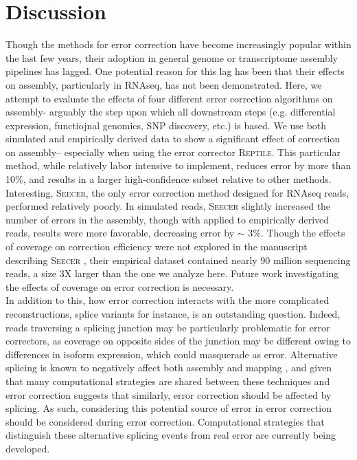 \documentclass[11pt]{article}
\begin{document}
\section*{Discussion}

Though the methods for error correction have become increasingly popular within the last few years, their adoption in general genome or transcriptome assembly pipelines has lagged. One potential reason for this lag has been that their effects on assembly, particularly in RNAseq, has not been demonstrated. Here, we attempt to evaluate the effects of four different error correction algorithms on assembly- arguably the step upon which all downstream steps (e.g. differential expression, functiojnal genomics, SNP discovery, etc.) is based. We use both simulated and empirically derived data to show a significant effect of correction on assembly-- especially when using the error corrector \textsc{Reptile}. This particular method, while relatively labor intensive to implement, reduces error by more than 10\%, and results in a larger high-confidence subset relative to other methods.  \\


\noindent
Interesting, \textsc{Seecer}, the only error correction method designed for RNAseq reads, performed relatively poorly. In simulated reads, \textsc{Seecer} slightly increased the number of errors in the assembly, though with applied to empirically derived reads, results were more favorable, decreasing error by $\sim$ 3\%.  Though the effects of coverage on correction efficiency were not explored in the manuscript describing \textsc{Seecer} \citep{Le:2013dy}, their empirical dataset contained nearly 90 million sequencing reads, a size 3X larger than the one we analyze here.  Future work investigating the effects of coverage on error correction is necessary.  \\

\noindent
In addition to this, how error correction interacts with the more complicated reconstructions, splice variants for instance, is an outstanding question. Indeed, reads traversing a splicing junction may be particularly problematic for error correctors, as coverage on opposite sides of the junction may be different owing to differences in isoform expression, which could masquerade as error.  Alternative splicing is known to negatively affect both assembly and mapping \citep{Vijay:2012gy,Sammeth:2009jx,Pyrkosz:2013tm}, and given that many computational strategies are shared between these techniques and error correction suggests that similarly, error correction should be affected by splicing.  As such, considering this potential source of error in error correction should be considered during error correction. Computational strategies that distinguish these alternative splicing events from real error are currently being developed.   
 
\end{document}
